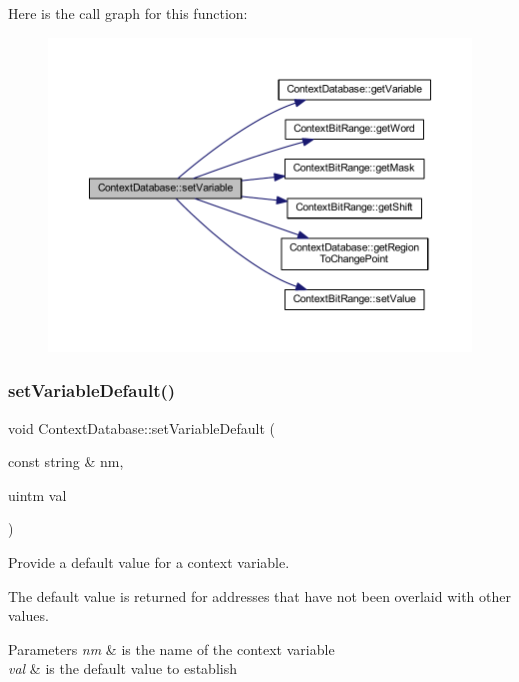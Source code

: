 Here is the call graph for this function\+:
\nopagebreak
\begin{figure}[H]
\begin{center}
\leavevmode
\includegraphics[width=350pt]{class_context_database_acda111acb02b6fdc598a7e872f002458_cgraph}
\end{center}
\end{figure}
\mbox{\label{class_context_database_ad076227dbe22aad0f4a379e2f39ef488}} 
\subsubsection{\texorpdfstring{setVariableDefault()}{setVariableDefault()}}
{\footnotesize\ttfamily void Context\+Database\+::set\+Variable\+Default (\begin{DoxyParamCaption}\item[{const string \&}]{nm,  }\item[{uintm}]{val }\end{DoxyParamCaption})}



Provide a default value for a context variable. 

The default value is returned for addresses that have not been overlaid with other values. 
\begin{DoxyParams}{Parameters}
{\em nm} & is the name of the context variable \\
\hline
{\em val} & is the default value to establish \\
\hline
\end{DoxyParams}


